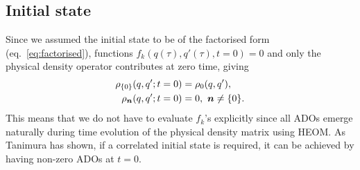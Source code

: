 \subsection{Initial state}
Since we assumed the initial state to be of the factorised form (eq.~\ref{eq:factorised}), functions $f_k(q(\tau),q'(\tau),t=0)=0$ and only the physical density operator contributes at zero time, giving
\begin{align}
\rho_{\{0\}}(q,q';t=0) &= \rho_0(q,q'),\\
\rho_{\bm{n}}(q,q';t=0) &= 0,\ \bm{n} \neq \{0\}.
\end{align}
This means that we do not have to evaluate $f_k$'s explicitly since all ADOs emerge naturally during time evolution of the physical density matrix using HEOM. As Tanimura has shown, if a correlated initial state is required, it can be achieved by having non-zero ADOs at $t=0$.\supercite{Tanimura2006a,Tanimura2014}
